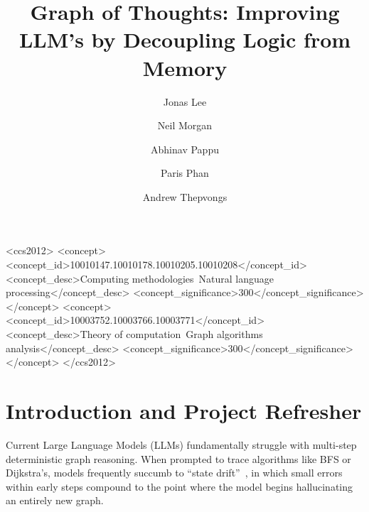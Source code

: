 \documentclass[sigplan,screen]{acmart}
\begin{document}
\title{Graph of Thoughts: Improving LLM's by Decoupling Logic from Memory}

\author{Jonas Lee}

\author{Neil Morgan}

\author{Abhinav Pappu}

\author{Paris Phan}

\author{Andrew Thepvongs}

\renewcommand{\shortauthors}{Lee et al.}

\begin{CCSXML}
<ccs2012>
 <concept>
  <concept_id>10010147.10010178.10010205.10010208</concept_id>
  <concept_desc>Computing methodologies~Natural language processing</concept_desc>
  <concept_significance>300</concept_significance>
 </concept>
 <concept>
  <concept_id>10003752.10003766.10003771</concept_id>
  <concept_desc>Theory of computation~Graph algorithms analysis</concept_desc>
  <concept_significance>300</concept_significance>
 </concept>
</ccs2012>
\end{CCSXML}



\maketitle

\section{Introduction and Project Refresher}

Current Large Language Models (LLMs) fundamentally struggle with multi-step deterministic graph reasoning. When prompted to trace algorithms like BFS or Dijkstra's, models frequently succumb to ``state drift''~\cite{got2024}, in which small errors within early steps compound to the point where the model begins hallucinating an entirely new graph.
\end{document}
